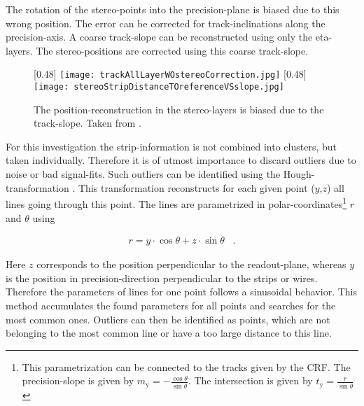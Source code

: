 \documentclass[
twoside,            %
BCOR1.4cm,          %
10pt,               %
headings=normal,    %
headsepline,        %
clearplainpage,		%
final,              %
div=14,
open=right,
bibliography=toc
]{scrreprt}
\begin{document}
The rotation of the stereo-points into the precision-plane is biased due to this wrong position.
The error can be corrected for track-inclinations along the precision-axis.
A coarse track-slope can be reconstructed using only the eta-layers.
The stereo-positions are corrected using this coarse track-slope.

\begin{figure}[!h]
	\centering
	[0.48\textwidth]
	{\texttt{[image: trackAllLayerWOstereoCorrection.jpg]}}
	\hfill
	[0.48\textwidth]
	{\texttt{[image: stereoStripDistanceTOreferenceVSslope.jpg]}}
	\vspace{-2mm}
	\caption{
		The position-reconstruction in the stereo-layers is biased due to the track-slope.
		Taken from \cite{mohlThesis}.
	}
	\label{stereoBias}
\end{figure}

For this investigation the strip-information is not combined into clusters, but taken individually.
Therefore it is of utmost importance to discard outliers due to noise or bad signal-fits.
Such outliers can be identified using the Hough-transformation \cite{hough}.
This transformation reconstructs for each given point ($y$,$z$) all lines going through this point.
The lines are parametrized in polar-coordinates\footnote{
	This parametrization can be connected to the tracks given by the CRF. 
	The precision-slope is given by $m_{\mathrm{y}} = -\tfrac{\cos\!\theta}{\sin\!\theta}$. 
	The intersection is given by $t_{\mathrm{y}} = \tfrac{r}{\sin\!\theta}$
} $r$ and $\theta$ using

\begin{align}
	r = y \cdot \cos\!\theta + z \cdot \sin\!\theta \;\;\; .
\end{align}

Here $z$ corresponds to the position perpendicular to the readout-plane, whereas $y$ is the position in precision-direction perpendicular to the strips or wires.
Therefore the parameters of lines for one point follows a sinusoidal behavior.
This method accumulates the found parameters for all points and searches for the most common ones.
Outliers can then be identified as points, which are not belonging to the most common line or have a too large distance to this line.
\end{document}

